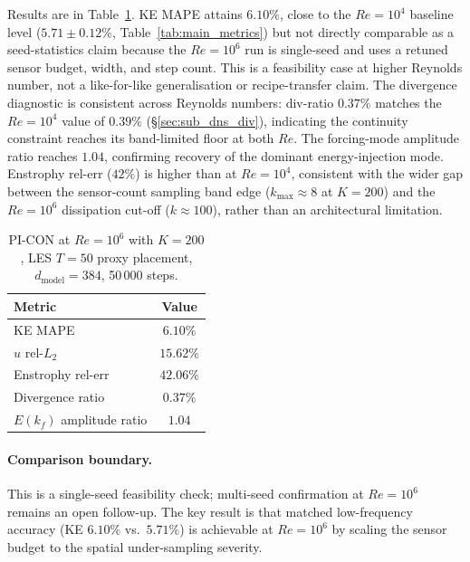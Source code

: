 Results are in Table~\ref{tab:re1e6}. KE MAPE attains $6.10\%$, close to the $Re=10^{4}$ baseline level ($5.71 \pm 0.12\%$, Table~\ref{tab:main_metrics}) but not directly comparable as a seed-statistics claim because the $Re=10^{6}$ run is single-seed and uses a retuned sensor budget, width, and step count. This is a feasibility case at higher Reynolds number, not a like-for-like generalisation or recipe-transfer claim.
The divergence diagnostic is consistent across Reynolds numbers: div-ratio $0.37\%$ matches the $Re=10^{4}$ value of $0.39\%$ (\S\ref{sec:sub_dns_div}), indicating the continuity constraint reaches its band-limited floor at both $Re$.
The forcing-mode amplitude ratio reaches $1.04$, confirming recovery of the dominant energy-injection mode.
Enstrophy rel-err ($42\%$) is higher than at $Re=10^{4}$, consistent with the wider gap between the sensor-count sampling band edge ($k_\text{max}\approx8$ at $K=200$) and the $Re=10^{6}$ dissipation cut-off ($k\approx100$), rather than an architectural limitation.

\begin{table}[!htbp]
    \centering
    \caption{PI-CON at $Re=10^{6}$ with $K=200$, LES $T=50$ proxy placement, $d_\text{model}=384$, 50\,000 steps.}
    \label{tab:re1e6}
    \small
    \begin{tabular}{lc}
    \toprule
    \textbf{Metric} & \textbf{Value} \\
    \midrule
    KE MAPE & $6.10\%$ \\
    $u$ rel-$L_2$ & $15.62\%$ \\
    Enstrophy rel-err & $42.06\%$ \\
    Divergence ratio & $0.37\%$ \\
    $E(k_f)$ amplitude ratio & $1.04$ \\
    \bottomrule
    \end{tabular}
\end{table}

\paragraph{Comparison boundary.}
This is a single-seed feasibility check; multi-seed confirmation at $Re=10^{6}$ remains an open follow-up.
The key result is that matched low-frequency accuracy (KE $6.10\%$ vs.\ $5.71\%$) is achievable at $Re=10^{6}$ by scaling the sensor budget to the spatial under-sampling severity.

